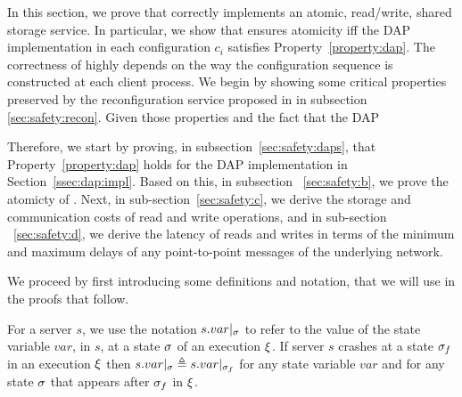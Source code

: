 In this section, we prove that \ares{} correctly implements an atomic, read/write, shared storage service. 
In particular, we show that \ares{} ensures atomicity iff the DAP implementation in each configuration $c_i$
satisfies Property~\ref{property:dap}.
The correctness of \ares{} highly depends on the way the configuration 
sequence is constructed at each client process.
We begin by showing some critical properties preserved by the reconfiguration service proposed in \ares{} in subsection \ref{sec:safety:recon}.
Given those properties and the fact that the DAP 


Therefore, we start by proving, in subsection~\ref{sec:safety:daps},  that 
Property~\ref{property:dap} holds for the DAP implementation in Section~\ref{ssec:dap:impl}. 
Based on this, in subsection ~\ref{sec:safety:b}, we prove the atomicty of \ares{}. Next, in sub-section~\ref{sec:safety:c}, we derive the storage
and communication costs of read and write operations, and in sub-section ~\ref{sec:safety:d}, we derive the latency
of reads and writes in terms of the minimum and maximum delays of any point-to-point messages of the 
underlying network.

We proceed by first introducing some definitions and notation, that we will use in the proofs that follow. 

	For a server $s$, we use the notation $s.var|_{\sigma}$ to refer to the value of the state variable $var$, in $s$, at a state $\sigma$ of an  execution $\EX$. 
	If server  $s$ crashes at a state $\sigma_f$ in an execution $\EX$ then $s.var|_{\sigma}\triangleq s.var|_{\sigma_f}$ for any state variable $var$ and for 
	any state $\sigma$ that appears after $\sigma_f$ in $\EX$. 


